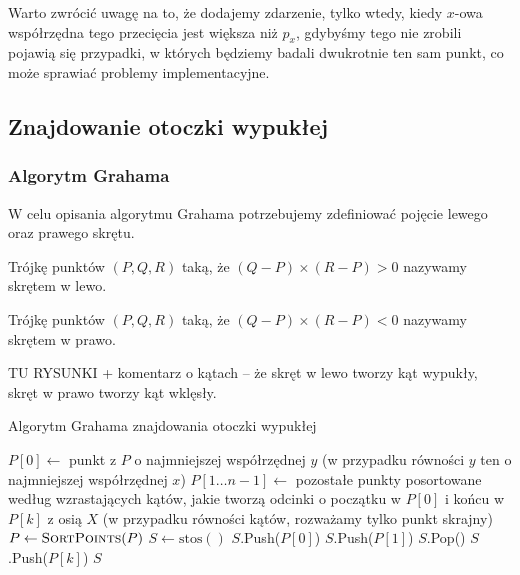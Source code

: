 Warto zwrócić uwagę na to, że dodajemy zdarzenie, tylko wtedy, kiedy
$x$-owa współrzędna tego przecięcia jest większa niż $p_x$, gdybyśmy tego nie zrobili
pojawią się przypadki, w których będziemy badali dwukrotnie ten sam punkt, co 
może sprawiać problemy implementacyjne.

\subsection{Znajdowanie otoczki wypukłej}

\subsubsection{Algorytm Grahama}

W celu opisania algorytmu Grahama potrzebujemy zdefiniować pojęcie lewego oraz prawego skrętu.

\begin{defi}
	Trójkę punktów $(P, Q, R)$ taką, że $(Q-P) \times (R-P) > 0$ nazywamy skrętem w lewo.
\end{defi}
\begin{defi}
	Trójkę punktów $(P, Q, R)$ taką, że $(Q-P) \times (R-P) < 0$ nazywamy skrętem w prawo.
\end{defi}

TU RYSUNKI + komentarz o kątach -- że skręt w lewo tworzy kąt wypukły, skręt w prawo tworzy kąt wklęsły.

\begin{algorithm}[H]
	\caption{Algorytm Grahama znajdowania otoczki wypukłej}\label{alg:graham}
	\begin{algorithmic}[1]
			\State $P[0] \gets $ punkt z $P$ o najmniejszej współrzędnej $y$ (w przypadku równości $y$ ten o najmniejszej współrzędnej $x$)
			\State $P[1 \dots n-1] \gets $ pozostałe punkty posortowane według wzrastających kątów, jakie tworzą odcinki o początku w $P[0]$ i końcu w $P[k]$ z osią $X$ (w przypadku równości kątów, rozważamy tylko punkt skrajny)
		\EndProcedure
			\State $P \gets \textsc{SortPoints}(P)$
			\State $S \gets \text{stos}()$
			\State $S$.Push($P[0]$)
			\State $S$.Push($P[1]$)
					\State $S$.Pop()
				\EndWhile
				\State $S$.Push($P[k]$)
			\EndFor
			\State \Return $S$
		\EndProcedure
	\end{algorithmic}
\end{algorithm}

